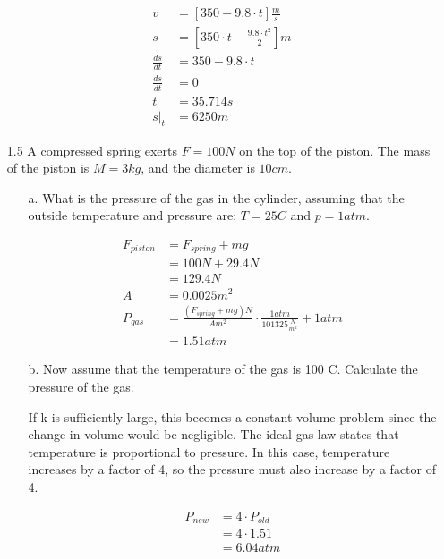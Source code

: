 \documentclass[10pt, a4paper]{article}
\begin{document}
\begin{enumerate}
    \setcounter{equation}{0}
    \begin{align}
      v &= [350 - 9.8\cdot t]\frac{m}{s} \\
      s &= [350\cdot t - \frac{9.8\cdot t^2}{2}]m \\
      \frac{ds}{dt} &= 350 - 9.8 \cdot t \\
      \frac{ds}{dt} &= 0 \\
      t &= 35.714 s \\
      s |_{t} &= 6250m
    \end{align}

  \item[1.5] A compressed spring exerts $F=100N$ on the top of the piston. The mass of the piston is $M=3kg$, and the diameter is
    $10 cm$.
    \begin{enumerate}
      \item[a.] What is the pressure of the gas in the cylinder, assuming that the outside temperature and pressure are:
        $T=25C$ and $p=1atm$.

        \setcounter{equation}{0}
        \begin{align}
          F_{piston} &= F_{spring} + mg \\
          &= 100N + 29.4N \\
          &= 129.4 N \\
          A &= 0.0025 m^2 \\
          P_{gas} &= \frac{(F_{spring} + mg)N}{A m^2} \cdot \frac{1 atm}{101325\frac{N}{m^2}} + 1atm \\
          &= 1.51 atm
        \end{align}

      \item[b.] Now assume that the temperature of the gas is 100 C. Calculate the pressure of the gas.

        If k is sufficiently large, this becomes a constant volume problem since the change in volume would
        be negligible. The ideal gas law states that temperature is proportional to pressure. In this case,
        temperature increases by a factor of 4, so the pressure must also increase by a factor of 4.

        \setcounter{equation}{0}
        \begin{align}
          P_{new} &= 4 \cdot P_{old} \\
          &= 4 \cdot 1.51 \\
          &= 6.04 atm
        \end{align}

    \end{enumerate}

\end{enumerate}
\end{document}

